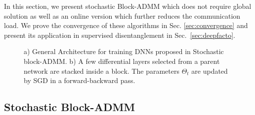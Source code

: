 In this section, we present stochastic Block-ADMM which does not require global solution as well as an online version which further reduces the communication load. We prove the convergence of these algorithms in Sec. \ref{sec:convergence} and present its application in supervised disentanglement in Sec.~\ref{sec:deepfacto}.

\begin{figure*}[t]
\begin{center}
\end{center}
\caption{\small a) General Architecture for training DNNs proposed in Stochastic block-ADMM. b) A few differential layers selected from a parent network are stacked inside a block. The parameters $\Theta_t$ are updated by SGD in a forward-backward pass.}
\end{figure*}





\subsection{Stochastic Block-ADMM}\label{sec:block_admm}

